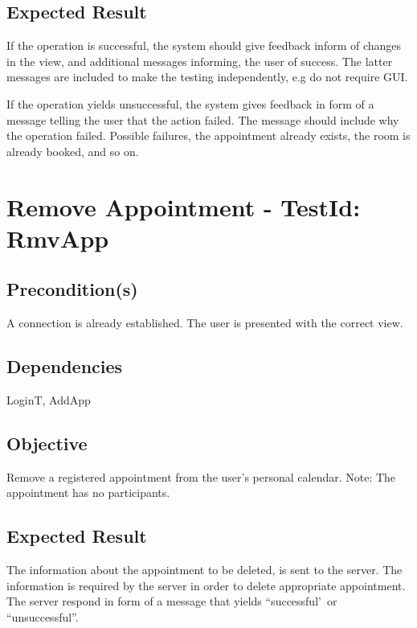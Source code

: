 \documentclass{article}
\begin{document}
\subsection{Expected Result}

If the operation is successful, the system should give feedback inform of
changes in the view, and additional messages informing, the user of success.
The latter messages are included to make the testing independently, e.g do
not require GUI.

If the operation yields unsuccessful, the system gives feedback in form of a
message telling the user that the action failed. The message should include
why the operation failed. Possible failures, the appointment already exists,
the room is already booked, and so on. \newpage

\section{Remove Appointment - TestId: RmvApp}

\subsection{Precondition(s)}

A connection is already established. The user is presented with the correct
view.

\subsection{Dependencies}

LoginT, AddApp

\subsection{Objective}

Remove a registered appointment from the user's personal calendar. Note: The
appointment has no participants.

\subsection{Expected Result}

The information about the appointment to be deleted, is sent to the server.
The information is required by the server in order to delete appropriate
appointment. The server respond in form of a message that yields
``successful'\ or ``unsuccessful''.
\end{document}
